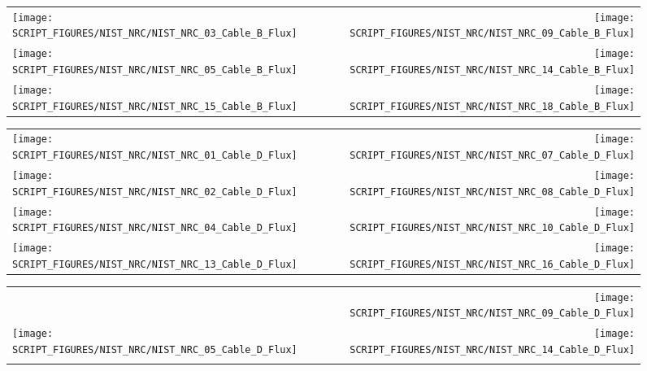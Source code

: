 \begin{figure}[p]
\begin{tabular*}{\textwidth}{l@{\extracolsep{\fill}}r}
\texttt{[image: SCRIPT\_FIGURES/NIST\_NRC/NIST\_NRC\_03\_Cable\_B\_Flux]} &
\texttt{[image: SCRIPT\_FIGURES/NIST\_NRC/NIST\_NRC\_09\_Cable\_B\_Flux]} \\
\texttt{[image: SCRIPT\_FIGURES/NIST\_NRC/NIST\_NRC\_05\_Cable\_B\_Flux]} &
\texttt{[image: SCRIPT\_FIGURES/NIST\_NRC/NIST\_NRC\_14\_Cable\_B\_Flux]} \\
\texttt{[image: SCRIPT\_FIGURES/NIST\_NRC/NIST\_NRC\_15\_Cable\_B\_Flux]} &
\texttt{[image: SCRIPT\_FIGURES/NIST\_NRC/NIST\_NRC\_18\_Cable\_B\_Flux]}
\end{tabular*}
\label{NIST_NRC_Cable_B_Flux_Open}
\end{figure}

\begin{figure}[p]
\begin{tabular*}{\textwidth}{l@{\extracolsep{\fill}}r}
\texttt{[image: SCRIPT\_FIGURES/NIST\_NRC/NIST\_NRC\_01\_Cable\_D\_Flux]} &
\texttt{[image: SCRIPT\_FIGURES/NIST\_NRC/NIST\_NRC\_07\_Cable\_D\_Flux]} \\
\texttt{[image: SCRIPT\_FIGURES/NIST\_NRC/NIST\_NRC\_02\_Cable\_D\_Flux]} &
\texttt{[image: SCRIPT\_FIGURES/NIST\_NRC/NIST\_NRC\_08\_Cable\_D\_Flux]} \\
\texttt{[image: SCRIPT\_FIGURES/NIST\_NRC/NIST\_NRC\_04\_Cable\_D\_Flux]} &
\texttt{[image: SCRIPT\_FIGURES/NIST\_NRC/NIST\_NRC\_10\_Cable\_D\_Flux]} \\
\texttt{[image: SCRIPT\_FIGURES/NIST\_NRC/NIST\_NRC\_13\_Cable\_D\_Flux]} &
\texttt{[image: SCRIPT\_FIGURES/NIST\_NRC/NIST\_NRC\_16\_Cable\_D\_Flux]}
\end{tabular*}
\label{NIST_NRC_Cable_D_Flux_Closed}
\end{figure}

\begin{figure}[p]
\begin{tabular*}{\textwidth}{l@{\extracolsep{\fill}}r}
                           &
\texttt{[image: SCRIPT\_FIGURES/NIST\_NRC/NIST\_NRC\_09\_Cable\_D\_Flux]} \\
\texttt{[image: SCRIPT\_FIGURES/NIST\_NRC/NIST\_NRC\_05\_Cable\_D\_Flux]} &
\texttt{[image: SCRIPT\_FIGURES/NIST\_NRC/NIST\_NRC\_14\_Cable\_D\_Flux]} \\
                      &
\end{tabular*}
\label{NIST_NRC_Cable_D_Flux_Open}
\end{figure}


